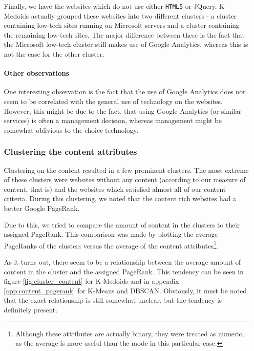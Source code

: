 Finally, we have the websites which do not use either \texttt{HTML5} or JQuery. K-Medoids actually grouped these websites into two different clusters - a cluster containing low-tech sites running on Microsoft servers and a cluster containing the remaining low-tech sites. The major difference between these is the fact that the Microsoft low-tech cluster still makes use of Google Analytics, whereas this is not the case for the other cluster.

\paragraph{Other observations} 

One interesting observation is the fact that the use of Google Analytics does not seem to be correlated with the general use of technology on the websites. However, this might be due to the fact, that using Google Analytics (or similar services) is often a management decision, whereas management might be somewhat oblivious to the choice technology.

\subsubsection{Clustering the content attributes}

Clustering on the content resulted in a few prominent clusters. The most extreme of these clusters were websites without any content (according to our measure of content, that is) and the websites which satisfied almost all of our content criteria. During this clustering, we noted that the content rich websites had a better Google PageRank.

Due to this, we tried to compare the amount of content in the clusters to their assigned PageRank. This comparison was made by plotting the average PageRanks of the clusters versus the average of the content attributes\footnote{Although these attributes are actually binary, they were treated as numeric, as the average is more useful than the mode in this particular case.}.

As it turns out, there seem to be a relationship between the average amount of content in the cluster and the assigned PageRank. This tendency can be seen in figure \ref{fig:cluster_content} for K-Medoids and in appendix \ref{app:content_pagerank} for K-Means and DBSCAN. Obviously, it must be noted that the exact relationship is still somewhat unclear, but the tendency is definitely present.


